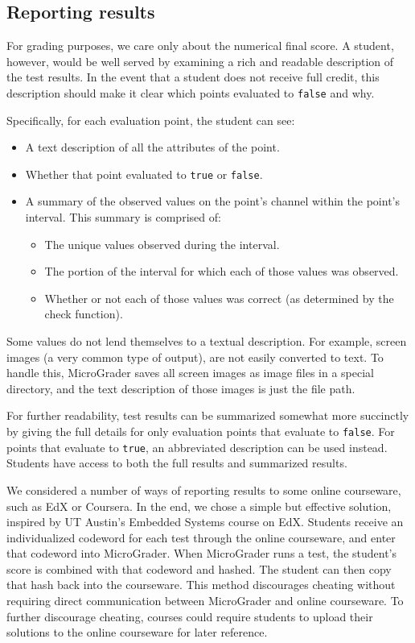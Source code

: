 \documentclass[12pt]{article}
\begin{document}
\subsection{Reporting results}
For grading purposes, we care only about the numerical final score.  A student, however, would be well served by examining a rich and readable description of the test results.  In the event that a student does not receive full credit, this description should make it clear which points evaluated to \texttt{false} and why.

Specifically, for each evaluation point, the student can see:

\begin{itemize}
\item A text description of all the attributes of the point.
\item Whether that point evaluated to \texttt{true} or \texttt{false}.
\item A summary of the observed values on the point's channel within the point's interval.  This summary is comprised of:
\begin{itemize}
\item The unique values observed during the interval.
\item The portion of the interval for which each of those values was observed.
\item Whether or not each of those values was correct (as determined by the check function).
\end{itemize}
\end{itemize}

Some values do not lend themselves to a textual description.  For example, screen images (a very common type of output), are not easily converted to text.  To handle this, MicroGrader saves all screen images as image files in a special directory, and the text description of those images is just the file path.

For further readability, test results can be summarized somewhat more succinctly by giving the full details for only evaluation points that evaluate to \texttt{false}.  For points that evaluate to \texttt{true}, an abbreviated description can be used instead.  Students have access to both the full results and summarized results.

We considered a number of ways of reporting results to some online courseware, such as EdX or Coursera.  In the end, we chose a simple but effective solution, inspired by UT Austin's Embedded Systems course on EdX.  Students receive an individualized codeword for each test through the online courseware, and enter that codeword into MicroGrader.  When MicroGrader runs a test, the student's score is combined with that codeword and hashed.  The student can then copy that hash back into the courseware.  This method discourages cheating without requiring direct communication between MicroGrader and online courseware.  To further discourage cheating, courses could require students to upload their solutions to the online courseware for later reference.
\end{document}
